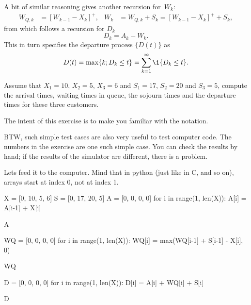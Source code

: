A bit of similar reasoning gives another recursion for~$W_k$:
\begin{align}
  \label{eq:59}
  W_{Q,k} &= [W_{k-1} - X_k]^+, &
  W_{k} &= W_{Q,k} + S_k = [W_{k-1} - X_k]^+ + S_k,
\end{align}
from which follows a recursion for $D_k$
\begin{equation}
  D_k = A_k + W_k.
\end{equation}
This in turn specifies the departure process $\{D(t)\}$ as
\begin{equation*}
  D(t) = \max\{k; D_k \leq t\} = \sum_{k=1}^\infty \1{D_k \leq t}.
\end{equation*}

\begin{exercise}
 Assume that $X_1=10$, $X_2=5$, $X_3=6$ and $S_1 = 17$,
    $S_2=20$ and $S_3=5$, compute the arrival times, waiting times in
    queue, the sojourn times and the departure times for these three
    customers.
  \begin{hint}
     The intent of this exercise is
      to make you familiar with the notation.

      BTW, such simple test cases are also very useful to test
      computer code. The numbers in the exercise are one such simple
      case. You can check the results by hand; if the results of the
      simulator are different, there is a problem.
    \end{hint}
    \begin{solution} Lets feed it to the computer. Mind that in python (just like in C, and so on), arrays start at index 0, not at index 1. 
\begin{pyconsole}
X = [0, 10, 5, 6] 
S = [0, 17, 20, 5]
A = [0, 0, 0, 0]
for i in range(1, len(X)):
    A[i] = A[i-1] + X[i]

A

WQ = [0, 0, 0, 0]
for i in range(1, len(X)):
    WQ[i] = max(WQ[i-1] + S[i-1] - X[i], 0)

WQ

D = [0, 0, 0, 0]
for i in range(1, len(X)):
    D[i] = A[i] + WQ[i] + S[i]

D
\end{pyconsole}
      
    \end{solution}
  \end{exercise}

